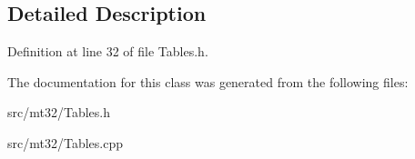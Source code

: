 \subsection{Detailed Description}


Definition at line 32 of file Tables.\-h.



The documentation for this class was generated from the following files\-:\begin{DoxyCompactItemize}
\item 
src/mt32/Tables.\-h\item 
src/mt32/Tables.\-cpp\end{DoxyCompactItemize}
